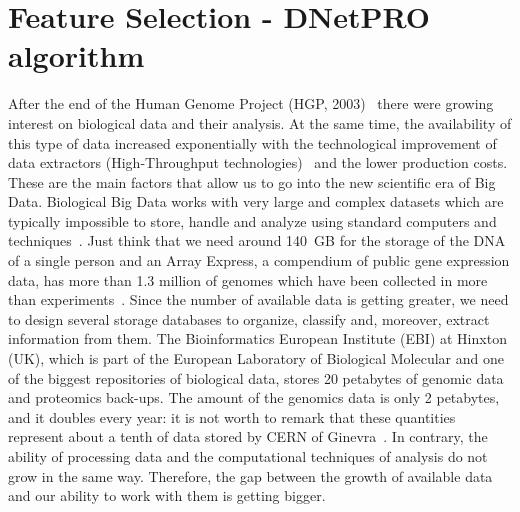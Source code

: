 \documentclass{standalone}
\begin{document}
\chapter[Feature Selection]{Feature Selection - DNetPRO algorithm}\label{chapter1:featsel}



After the end of the Human Genome Project (HGP, 2003)~\cite{McKinney2012} there were growing interest on biological data and their analysis.
At the same time, the availability of this type of data increased exponentially with the technological improvement of data extractors (High-Throughput technologies)~\cite{Reuter2015} and the lower production costs.
These are the main factors that allow us to go into the new scientific era of Big Data.
Biological Big Data works with very large and complex datasets which are typically impossible to store, handle and analyze using standard computers and techniques~\cite{Kumari2014}.
Just think that we need around 140~GB for the storage of the DNA of a single person and an Array Express, a compendium of public gene expression data, has more than 1.3 million of genomes which have been collected in more than  experiments~\cite{Greene2014}.
Since the number of available data is getting greater, we need to design several storage databases to organize, classify and, moreover, extract information from them.
The Bioinformatics European Institute (EBI) at Hinxton (UK), which is part of the European Laboratory of Biological Molecular and one of the biggest repositories of biological data, stores 20 petabytes of genomic data and proteomics back-ups.
The amount of the genomics data is only 2 petabytes, and it doubles every year: it is not worth to remark that these quantities represent about a tenth of data stored by CERN of Ginevra~\cite{Marx2013}.
In contrary, the ability of processing data and the computational techniques of analysis do not grow in the same way.
Therefore, the gap between the growth of available data and our ability to work with them is getting bigger.
\end{document}
